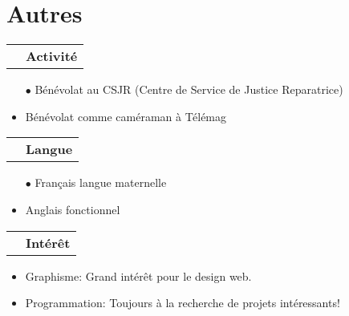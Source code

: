 \documentclass[a4paper,10pt]{extarticle}
\makeatletter
\newlength{\indicewidth}%
\newlength{\separatorcolumnwidth}%
\newlength{\maincolumnwidth}%
\newcommand{\indicestyle}[1]{\slshape\textcolor{color0}{#1}}
\def\middleline{
\raisebox{0.35em}{\line(1,0){50}}
}
\renewcommand{\subsection}[1]{
\par\addvspace{3ex}
\begin{tabular}{@{}p{\indicewidth}@{\hspace{\separatorcolumnwidth}}p{\maincolumnwidth}@{}}%
    \raggedleft\indicestyle{}\middleline & { \strut\bfseries {#1} }%
    \par
\end{tabular}%
\vspace{-0.5em}
}
\makeatother
\begin{document}
\section{Autres}
\subsection{Activité}
\begin{itemize}

\item[$\bullet$]Bénévolat au CSJR (Centre de Service de Justice Reparatrice)
\item Bénévolat comme caméraman à Télémag
\end{itemize}
\subsection{Langue}
\begin{itemize}
\item[$\bullet$] Français langue maternelle 
\item Anglais fonctionnel
\end{itemize}

\subsection{Intérêt}
\begin{itemize}
\item Graphisme: Grand intérêt pour le design web.
\item Programmation: Toujours à la recherche de projets intéressants!
\end{itemize}

\end{document}
